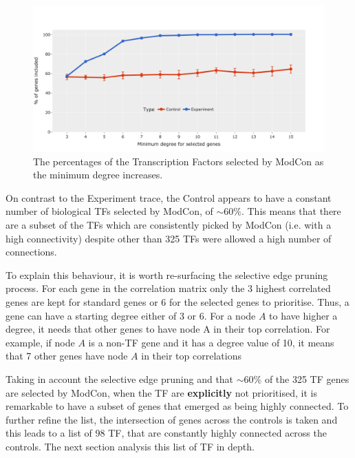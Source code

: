 \begin{figure}[!ht]   
\centering
\includegraphics[width=1.0\textwidth,height=1.0\textheight,keepaspectratio]{Sections/Network_I/Resources/selective_pruning/ctrls_min_dig_mev.png}
  \caption{The percentages of the Transcription Factors selected by ModCon as the minimum degree increases.}
\label{fig:N_I:sel_tfs}
\end{figure}

On contrast to the Experiment trace, the Control appears to have a constant number of biological TFs selected by ModCon, of $\sim60\%$. This means that there are a subset of the TFs which are consistently picked by ModCon (i.e. with a high connectivity) despite other than 325 TFs were allowed a high number of connections. 

To explain this behaviour, it is worth re-surfacing the selective edge pruning process. For each gene in the correlation matrix only the 3 highest correlated genes are kept for standard genes or 6 for the selected genes to prioritise. Thus, a gene can have a starting degree either of 3 or 6. For a node $A$ to have higher a degree, it needs that other genes to have node A in their top correlation. For example, if node $A$ is a non-TF gene and it has a degree value of 10, it means that 7 other genes have node $A$ in their top correlations

Taking in account the selective edge pruning and that $\sim60\%$ of the 325 TF genes are selected by ModCon, when the TF are \textbf{explicitly} not prioritised, it is remarkable to have a subset of genes that emerged as being highly connected. To further refine the list, the intersection of genes across the controls is taken and this leads to a list of 98 TF, that are constantly highly connected across the controls. The next section analysis this list of TF in depth. 

